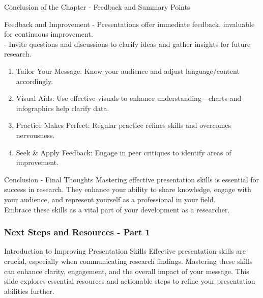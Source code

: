 \documentclass[aspectratio=169]{beamer}
\begin{document}
\begin{frame}[fragile]{Conclusion of the Chapter - Feedback and Summary Points}
    \begin{block}{Feedback and Improvement}
        - Presentations offer immediate feedback, invaluable for continuous improvement. \\
        - Invite questions and discussions to clarify ideas and gather insights for future research.
    \end{block}
    \begin{enumerate}
        \item Tailor Your Message: Know your audience and adjust language/content accordingly.
        \item Visual Aids: Use effective visuals to enhance understanding—charts and infographics help clarify data.
        \item Practice Makes Perfect: Regular practice refines skills and overcomes nervousness.
        \item Seek \& Apply Feedback: Engage in peer critiques to identify areas of improvement.
    \end{enumerate}
\end{frame}

\begin{frame}[fragile]{Conclusion - Final Thoughts}
    Mastering effective presentation skills is essential for success in research. They enhance your ability to share knowledge, engage with your audience, and represent yourself as a professional in your field. \\
    Embrace these skills as a vital part of your development as a researcher.
\end{frame}

\begin{frame}[fragile]
    \frametitle{Next Steps and Resources - Part 1}
    \begin{block}{Introduction to Improving Presentation Skills}
        Effective presentation skills are crucial, especially when communicating research findings. Mastering these skills can enhance clarity, engagement, and the overall impact of your message. This slide explores essential resources and actionable steps to refine your presentation abilities further.
    \end{block}
\end{frame}
\end{document}
